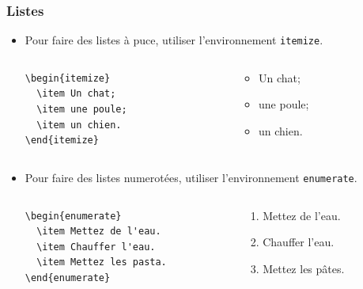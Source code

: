 \begin{frame}[fragile]
  \frametitle{Listes}
  \begin{itemize}
    \item Pour faire des listes à puce, utiliser l'environnement \lstinline|itemize|.
    \begin{columns}
      \begin{column}{0.45\textwidth}
        \begin{lstlisting}[style=nonumbers]
\begin{itemize}
  \item Un chat;
  \item une poule;
  \item un chien.
\end{itemize}
        \end{lstlisting}
      \end{column}
      \begin{column}{0.45\textwidth}
        \begin{itemize}
          \item Un chat;
          \item une poule;
          \item un chien.
        \end{itemize}
      \end{column}
    \end{columns}

    \item Pour faire des listes numerotées, utiliser l'environnement \lstinline|enumerate|.
    \begin{columns}
      \begin{column}{0.45\textwidth}
        \begin{lstlisting}[style=nonumbers]
\begin{enumerate}
  \item Mettez de l'eau.
  \item Chauffer l'eau.
  \item Mettez les pasta.
\end{enumerate}
        \end{lstlisting}
      \end{column}
      \begin{column}{0.45\textwidth}
        \begin{enumerate}
          \item Mettez de l'eau.
          \item Chauffer l'eau.
          \item Mettez les pâtes.
        \end{enumerate}
      \end{column}
    \end{columns}
  \end{itemize}

\end{frame}

